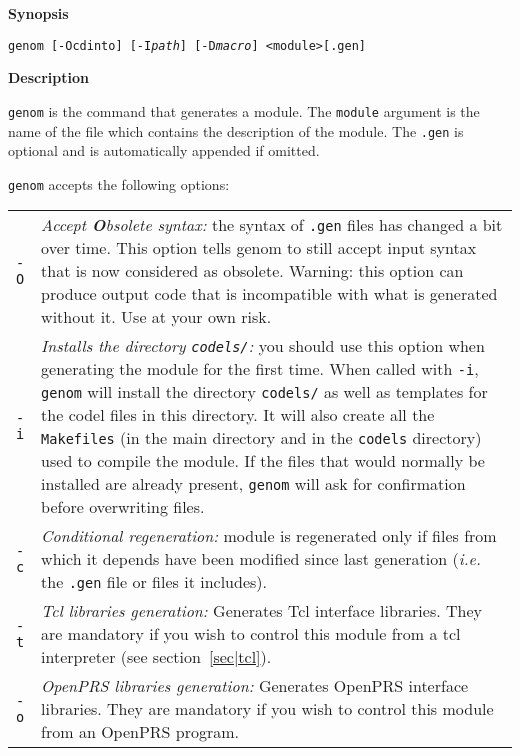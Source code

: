 \begin{description}

\item\textbf{Synopsis}

\texttt{genom [-Ocdinto] [-I\emph{path}] [-D\emph{macro}] <module>[.gen]}

\item\textbf{Description}

\texttt{genom}  is the  command that  generates a  module. The  \texttt{module}
argument is the name  of the file which  contains the description of  the
module. The \texttt{.gen} is   optional and  is  automatically appended  if
omitted.

\texttt{genom} accepts the following options:

\begin{tabularx}{\linewidth}{lX}
\texttt{-O} & \emph{Accept \textbf{O}bsolete syntax:} the syntax of
\texttt{.gen} files has changed a bit over time. This option tells
genom to still accept input syntax that is now considered as obsolete.
Warning: this option can produce output code that is incompatible with
what is generated without it. Use at your own risk. \\

\texttt{-i} &  \emph{Installs the  directory  \texttt{codels/}:} you should  use
this option when  generating the module  for the first time. When  called
with \texttt{-i}, \texttt{genom} will install  the directory \texttt{codels/} as
well as templates for  the codel files in this  directory.  It  will also
create  all the \texttt{Makefiles}  (in the main directory   and in the 
\texttt{codels} directory) used to compile  the module.  If  the files that would
normally be  installed  are already present, \texttt{genom}  will ask  for
confirmation before overwriting files.\\

\texttt{-c} & \emph{Conditional regeneration:} module is regenerated only
if files from which  it depends have  been modified since last generation
(\emph{i.e.} the \texttt{.gen} file or files it includes).\\

\texttt{-t} &    \emph{Tcl libraries  generation:}    Generates Tcl interface
libraries. They are mandatory  if you wish to  control this module from a
tcl interpreter (see section~\ref{sec|tcl}).\\

\texttt{-o}  & \emph{OpenPRS libraries generation:} Generates OpenPRS
interface libraries.  They are  mandatory  if you   wish to  control this
module from an OpenPRS program.\\


\end{tabularx}
\end{description}

